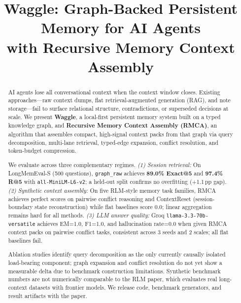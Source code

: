 \documentclass[conference]{IEEEtran}
\begin{document}
\title{Waggle: Graph-Backed Persistent Memory for AI Agents\\
with Recursive Memory Context Assembly}

\author{
}

\maketitle

\begin{abstract}
AI agents lose all conversational context when the context window closes.
Existing approaches---raw context dumps, flat retrieval-augmented generation (RAG),
and note storage---fail to surface relational structure, contradictions, or superseded
decisions at scale.
We present \textbf{Waggle}, a local-first persistent memory system built on a typed
knowledge graph, and \textbf{Recursive Memory Context Assembly (RMCA)}, an algorithm
that assembles compact, high-signal context packs from that graph via query decomposition,
multi-lane retrieval, typed-edge expansion, conflict resolution, and token-budget compression.

We evaluate across three complementary regimes.
\textit{(1) Session retrieval:} On LongMemEval-S (500 questions), \texttt{graph\_raw}
achieves \textbf{89.0\% Exact@5} and \textbf{97.4\% R@5} with \texttt{all-MiniLM-L6-v2};
a held-out split confirms no overfitting (+1.1\,pp gap).
\textit{(2) Synthetic context assembly:} On five RLM-style memory task families,
RMCA achieves perfect scores on pairwise conflict reasoning and ContextReset
(session-boundary state reconstruction) while flat baselines score 0.0; linear aggregation
remains hard for all methods.
\textit{(3) LLM answer quality:} Groq \texttt{llama-3.3-70b-versatile} achieves
EM=1.0, F1=1.0, and hallucination rate=0.0 when given RMCA context packs on pairwise
conflict tasks, consistent across 3 seeds and 2 scales; all flat baselines fail.

Ablation studies identify query decomposition as the only currently causally isolated
load-bearing component; graph expansion and conflict resolution do not yet show a
measurable delta due to benchmark construction limitations.
Synthetic benchmark numbers are not numerically comparable to the RLM paper, which
evaluates real long-context datasets with frontier models.
We release code, benchmark generators, and result artifacts with the paper.
\end{abstract}
\end{document}
